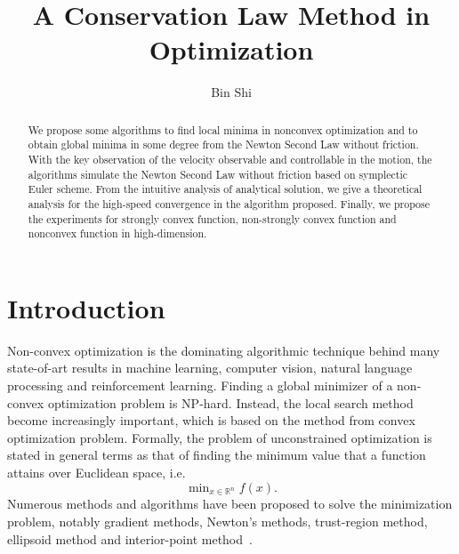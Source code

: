\documentclass[11pt,fceqn]{article}
\numberwithin{equation}{section}
\theoremstyle{definition}
\begin{document}
\title{\textbf{A Conservation Law Method in Optimization}}

\author{Bin Shi}%


\maketitle
\begin{abstract}

We propose some algorithms to find local minima in nonconvex optimization and to obtain global minima in some degree from the Newton Second Law without friction. With the key observation of the velocity observable and controllable in the motion, the algorithms simulate the Newton Second Law without friction based on symplectic Euler scheme. From the intuitive analysis of analytical solution, we give a theoretical analysis for the high-speed convergence in the algorithm proposed. Finally, we propose the experiments for strongly convex function, non-strongly convex function and nonconvex function in high-dimension.





\end{abstract}


\section{Introduction}
\label{sec:introduction}

Non-convex optimization is the dominating algorithmic technique behind many state-of-art results in machine learning, computer vision, natural language processing and reinforcement learning. Finding a global minimizer of a non-convex optimization problem is NP-hard. Instead, the local search method become increasingly important, which is based on the method from convex optimization problem. Formally, the problem of unconstrained  optimization is stated in general terms as that of finding the minimum value that a function attains over Euclidean space, i.e.
$$
\mathop{\text{min}}_{x \in \mathbb{R}^{n}}f(x).
$$
Numerous methods and algorithms have been proposed to solve the minimization problem, notably gradient methods, Newton's methods, trust-region method, ellipsoid method  and interior-point method~\citep{polyak1987introduction,nesterov2013introductory,wright1999numerical,luenberger1984linear,boyd2004convex,bubeck2015convex}.
\end{document}
